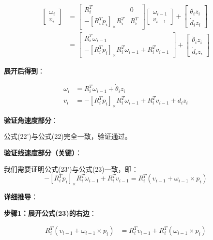 \documentclass[12pt,a4paper]{article}
\begin{document}
\begin{align}
\begin{bmatrix} \omega_i \\ v_i \end{bmatrix} &= \begin{bmatrix}
R_i^T & 0 \\
-[R_i^T p_i]_{\times} R_i^T & R_i^T
\end{bmatrix} \begin{bmatrix} \omega_{i-1} \\ v_{i-1} \end{bmatrix} + \begin{bmatrix} \dot{\theta}_i z_i \\ \dot{d}_i z_i \end{bmatrix} \\
&= \begin{bmatrix}
R_i^T \omega_{i-1} \\
-[R_i^T p_i]_{\times} R_i^T \omega_{i-1} + R_i^T v_{i-1}
\end{bmatrix} + \begin{bmatrix} \dot{\theta}_i z_i \\ \dot{d}_i z_i \end{bmatrix}
\end{align}

\textbf{展开后得到}：

\begin{align}
\omega_i &= R_i^T \omega_{i-1} + \dot{\theta}_i z_i \tag{22'} \\
v_i &= -[R_i^T p_i]_{\times} R_i^T \omega_{i-1} + R_i^T v_{i-1} + \dot{d}_i z_i \tag{23'}
\end{align}

\textbf{验证角速度部分}：

公式(22')与公式(22)完全一致，验证通过。

\textbf{验证线速度部分（关键）}：

我们需要证明公式(23')与公式(23)一致，即：
\begin{equation}
-[R_i^T p_i]_{\times} R_i^T \omega_{i-1} + R_i^T v_{i-1} = R_i^T (v_{i-1} + \omega_{i-1} \times p_i)
\end{equation}

\textbf{详细推导}：

\textbf{步骤1：展开公式(23)的右边}：

\begin{align}
R_i^T (v_{i-1} + \omega_{i-1} \times p_i) &= R_i^T v_{i-1} + R_i^T (\omega_{i-1} \times p_i)
\end{align}
\end{document}
